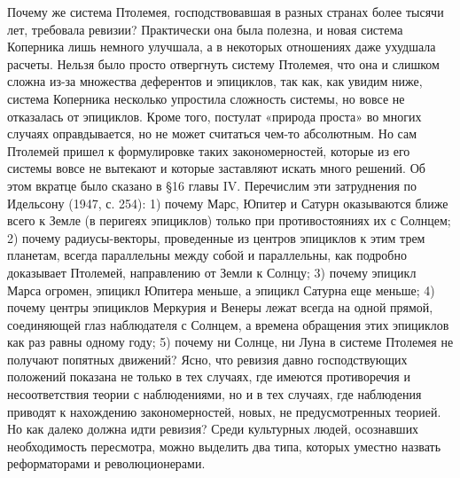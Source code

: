 Почему же система Птолемея, господствовавшая в разных странах более
тысячи лет, требовала ревизии? Практически она была полезна, и новая
система Коперника лишь немного улучшала, а в некоторых отношениях даже
ухудшала расчеты. Нельзя было просто отвергнуть систему Птолемея, что
она и слишком сложна из-за множества деферентов и эпициклов, так как,
как увидим ниже, система Коперника несколько упростила сложность
системы, но вовсе не отказалась от эпициклов. Кроме того, постулат
«природа проста» во многих случаях оправдывается, но не может
считаться чем-то абсолютным. Но сам Птолемей пришел к формулировке
таких закономерностей, которые из его системы вовсе не вытекают и
которые заставляют искать много решений. Об этом вкратце было сказано
в §16 главы IV. Перечислим эти затруднения по Идельсону (1947, с.
254): 1) почему Марс, Юпитер и Сатурн оказываются ближе всего к Земле
(в перигеях эпициклов) только при противостояниях их с Солнцем; 2)
почему радиусы-векторы, проведенные из центров эпициклов к этим трем
планетам, всегда параллельны между собой и параллельны, как подробно
доказывает Птолемей, направлению от Земли к Солнцу; 3) почему эпицикл
Марса огромен, эпицикл Юпитера меньше, а эпицикл Сатурна еще меньше;
4) почему центры эпициклов Меркурия и Венеры лежат всегда на одной
прямой, соединяющей глаз наблюдателя с Солнцем, а времена обращения
этих эпициклов как раз равны одному году; 5) почему ни Солнце, ни Луна
в системе Птолемея не получают попятных движений? Ясно, что ревизия
давно господствующих положений показана не только в тех случаях, где
имеются противоречия и несоответствия теории с наблюдениями, но и в
тех случаях, где наблюдения приводят к нахождению закономерностей,
новых, не предусмотренных теорией. Но как далеко должна идти ревизия?
Среди культурных людей, осознавших необходимость пересмотра, можно
выделить два типа, которых уместно назвать реформаторами и
революционерами.

